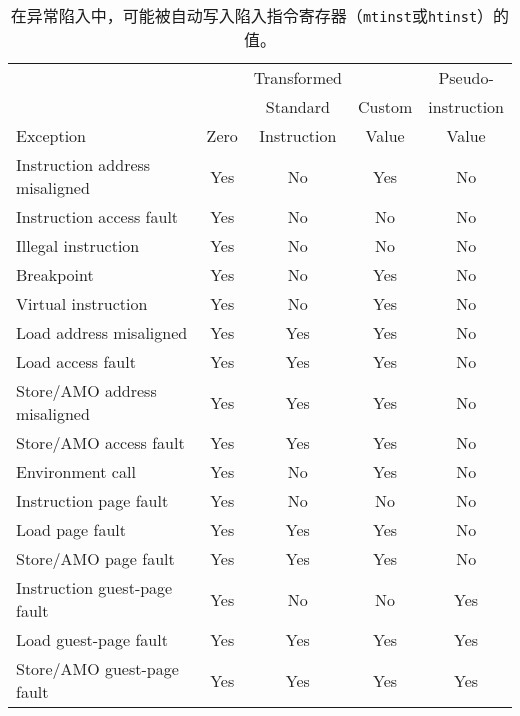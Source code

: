 \begin{table*}[h!]
\begin{center}
\begin{tabular}{|l|c|c|c|c|}
\hline
                               &      & Transformed &        & Pseudo- \\
                               &      & Standard    & Custom & instruction \\
Exception                      & Zero & Instruction & Value  & Value \\
\hline
Instruction address misaligned & Yes  & No          & Yes    & No  \\
\hline
Instruction access fault       & Yes  & No          & No     & No  \\
Illegal instruction            & Yes  & No          & No     & No  \\
Breakpoint                     & Yes  & No          & Yes    & No  \\
Virtual instruction            & Yes  & No          & Yes    & No  \\
\hline
Load address misaligned        & Yes  & Yes         & Yes    & No  \\
Load access fault              & Yes  & Yes         & Yes    & No  \\
Store/AMO address misaligned   & Yes  & Yes         & Yes    & No  \\
Store/AMO access fault         & Yes  & Yes         & Yes    & No  \\
\hline
Environment call               & Yes  & No          & Yes    & No  \\
\hline
Instruction page fault         & Yes  & No          & No     & No  \\
Load page fault                & Yes  & Yes         & Yes    & No  \\
Store/AMO page fault           & Yes  & Yes         & Yes    & No  \\
\hline
Instruction guest-page fault   & Yes  & No          & No     & Yes \\
Load guest-page fault          & Yes  & Yes         & Yes    & Yes \\
Store/AMO guest-page fault     & Yes  & Yes         & Yes    & Yes \\
\hline
\end{tabular}
\end{center}
\caption{ 在异常陷入中，可能被自动写入陷入指令寄存器（{\tt mtinst}或{\tt htinst}）的值。
}
\label{tab:tinst-values}
\end{table*}

